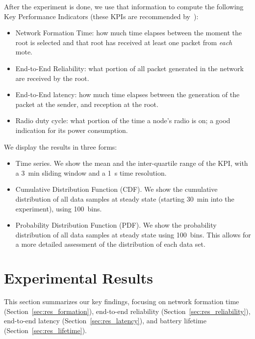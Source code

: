 \documentclass[sensors,article,submit,moreauthors,pdftex]{Definitions/mdpi}
\begin{document}

After the experiment is done, we use that information to compute the following Key Performance Indicators (these KPIs are recommended by~\cite{vucinic20key}):

\begin{itemize}
    \item Network Formation Time:
        how much time elapses between the moment the root is selected and that root has received at least one packet from \textit{each} mote. 
    \item End-to-End Reliability:
        what portion of all packet generated in the network are received by the root. 
    \item End-to-End latency:
        how much time elapses between the generation of the packet at the sender, and reception at the root.
    \item Radio duty cycle:
        what portion of the time a node's radio is on; a good indication for its power consumption.
\end{itemize}


We display the results in three forms:

\begin{itemize}
    \item Time series.
        We show the mean and the inter-quartile range of the KPI,
            with a 3~min sliding window and a 1~s time resolution. 
    \item Cumulative Distribution Function (CDF).
        We show the cumulative distribution of all data samples at steady state (starting 30~min into the experiment), using 100~bins.
    \item Probability Distribution Function (PDF).
        We show the probability distribution of all data samples at steady state using 100~bins.
        This allows for a more detailed assessment of the distribution of each data set. 
\end{itemize}

\section{Experimental Results}
\label{sec:results}

This section summarizes our key findings, focusing on
    network formation time (Section~\ref{sec:res_formation}),
    end-to-end reliability (Section~\ref{sec:res_reliability}),
    end-to-end latency (Section~\ref{sec:res_latency}), and
    battery lifetime (Section~\ref{sec:res_lifetime}).
\end{document}
